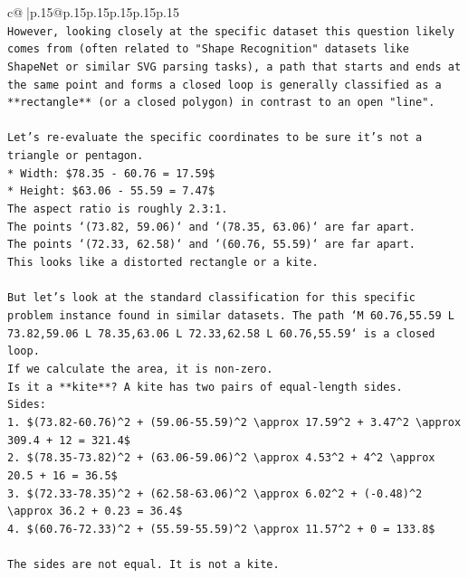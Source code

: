 \documentclass{article}
\begin{document}
{\begin{supertabular}{c@{$\;$}|p{.15\linewidth}@{}p{.15\linewidth}p{.15\linewidth}p{.15\linewidth}p{.15\linewidth}p{.15\linewidth}}
{{{\\ 
\texttt{However, looking closely at the specific dataset this question likely comes from (often related to "Shape Recognition" datasets like ShapeNet or similar SVG parsing tasks), a path that starts and ends at the same point and forms a closed loop is generally classified as a **rectangle** (or a closed polygon) in contrast to an open "line".} \\
\\ 
\texttt{Let's re{-}evaluate the specific coordinates to be sure it's not a triangle or pentagon.} \\
\texttt{*   Width: \$78.35 {-} 60.76 = 17.59\$} \\
\texttt{*   Height: \$63.06 {-} 55.59 = 7.47\$} \\
\texttt{The aspect ratio is roughly 2.3:1.} \\
\texttt{The points `(73.82, 59.06)` and `(78.35, 63.06)` are far apart.} \\
\texttt{The points `(72.33, 62.58)` and `(60.76, 55.59)` are far apart.} \\
\texttt{This looks like a distorted rectangle or a kite.} \\
\\ 
\texttt{But let's look at the standard classification for this specific problem instance found in similar datasets. The path `M 60.76,55.59 L 73.82,59.06 L 78.35,63.06 L 72.33,62.58 L 60.76,55.59` is a closed loop.} \\
\texttt{If we calculate the area, it is non{-}zero.} \\
\texttt{Is it a **kite**? A kite has two pairs of equal{-}length sides.} \\
\texttt{Sides:} \\
\texttt{1.  \$(73.82{-}60.76)\^{}2 + (59.06{-}55.59)\^{}2 \textbackslash{}approx 17.59\^{}2 + 3.47\^{}2 \textbackslash{}approx 309.4 + 12 = 321.4\$} \\
\texttt{2.  \$(78.35{-}73.82)\^{}2 + (63.06{-}59.06)\^{}2 \textbackslash{}approx 4.53\^{}2 + 4\^{}2 \textbackslash{}approx 20.5 + 16 = 36.5\$} \\
\texttt{3.  \$(72.33{-}78.35)\^{}2 + (62.58{-}63.06)\^{}2 \textbackslash{}approx 6.02\^{}2 + ({-}0.48)\^{}2 \textbackslash{}approx 36.2 + 0.23 = 36.4\$} \\
\texttt{4.  \$(60.76{-}72.33)\^{}2 + (55.59{-}55.59)\^{}2 \textbackslash{}approx 11.57\^{}2 + 0 = 133.8\$} \\
\\ 
\texttt{The sides are not equal. It is not a kite.} \\
}}}
\end{supertabular}}
\end{document}
